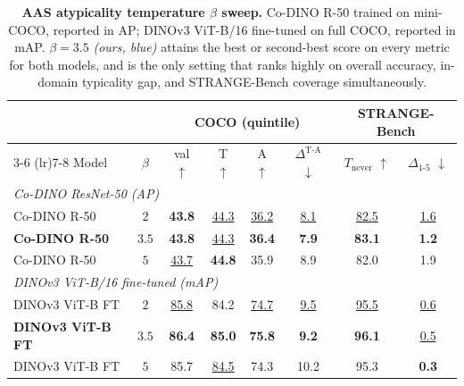 \begin{table}[!htp]%
\centering
\footnotesize
\setlength{\tabcolsep}{4pt}
\caption{\textbf{AAS atypicality temperature $\beta$ sweep.} Co-DINO R-50 trained on mini-COCO, reported in AP; DINOv3 ViT-B/16 fine-tuned on full COCO, reported in mAP. $\beta = 3.5$ \emph{(ours,
blue)} attains the best or second-best score on every metric for
both models, and is the only setting that ranks highly on overall
accuracy, in-domain typicality gap, and STRANGE-Bench coverage
simultaneously.}
\label{tab:beta_sweep}
\begin{tabular}{l c cccc cc}
\toprule
& & \multicolumn{4}{c}{\textbf{COCO (quintile)}} & \multicolumn{2}{c}{\textbf{STRANGE-Bench}} \\
\cmidrule(lr){3-6} \cmidrule(lr){7-8}
Model & $\beta$ & val $\uparrow$ & T $\uparrow$ & A $\uparrow$ & $\Delta^{\text{T-A}}$ $\downarrow$ & $T_{\text{never}}$ $\uparrow$ & $\Delta_{1\text{-}5}$ $\downarrow$ \\
\midrule
\multicolumn{8}{l}{\emph{Co-DINO ResNet-50 (AP)}} \\
Co-DINO R-50         & $2$   & \textbf{43.8}    & \underline{44.3} & \underline{36.2} & \underline{8.1} & \underline{82.5} & \underline{1.6} \\
\rowcolor{oursrow} \textbf{Co-DINO R-50} & $\boldsymbol{3.5}$ & \textbf{43.8}    & \underline{44.3} & \textbf{36.4}    & \textbf{7.9}    & \textbf{83.1}    & \textbf{1.2} \\
Co-DINO R-50         & $5$   & \underline{43.7} & \textbf{44.8}    & 35.9             & 8.9             & 82.0             & 1.9 \\
\midrule
\multicolumn{8}{l}{\emph{DINOv3 ViT-B/16 fine-tuned (mAP)}} \\
DINOv3 ViT-B FT      & $2$   & \underline{85.8} & 84.2             & \underline{74.7} & \underline{9.5} & \underline{95.5} & \underline{0.6} \\
\rowcolor{oursrow} \textbf{DINOv3 ViT-B FT} & $\boldsymbol{3.5}$ & \textbf{86.4}    & \textbf{85.0}    & \textbf{75.8}    & \textbf{9.2}    & \textbf{96.1}    & \underline{0.5} \\
DINOv3 ViT-B FT      & $5$   & 85.7             & \underline{84.5} & 74.3             & 10.2            & 95.3             & \textbf{0.3} \\
\bottomrule
\end{tabular}
\end{table}
